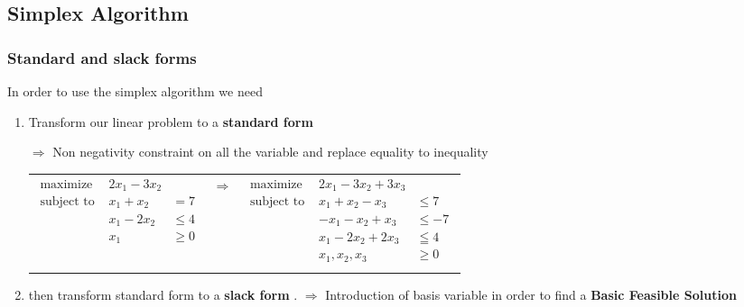\subsection{Simplex Algorithm}

\subsubsection{Standard and slack forms}
In order to use the simplex algorithm we need 
\begin{enumerate}
    \item Transform our linear problem  to  a \textbf{standard form}

        $\Rightarrow $ Non negativity constraint on all the
        variable and replace equality to inequality

\begin{scriptsize}
        \begin{tabular}{m{7cm}cm{7cm}}
            \begin{eqnarray*}
                \textrm{maximize } & 2x_1 - 3x_2\\
                \textrm{subject to } & x_1 + x_2 &= 7\\
                                     & x_1 - 2x_2 &\leq 4 \\
                                     & x_1 &\geq 0\\
            \end{eqnarray*}
            & $\Rightarrow$ &
            \begin{eqnarray*}
                \textrm{maximize } & 2x_1 - 3x_2 + 3x_3\\
                \textrm{subject to } & x_1 + x_2 - x_3 & \leq 7\\
                                     & -x_1 - x_2 + x_3 & \leq -7  \\
                                     & x_1 - 2x_2 + 2x_3 & \leqq 4 \\
                                     & x_1, x_2, x_3 & \geq 0\\
            \end{eqnarray*}
        \end{tabular}
\end{scriptsize}

    \item then transform standard form to a \textbf{slack form }.
        $\Rightarrow$  Introduction of basis variable in order to find a 
        \textbf{Basic Feasible Solution}


\end{enumerate}
